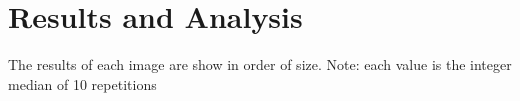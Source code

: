 \section{Results and Analysis}\label{sec:4}
    The results of each image are show in order of size. Note: each value is the integer median of 10 repetitions



